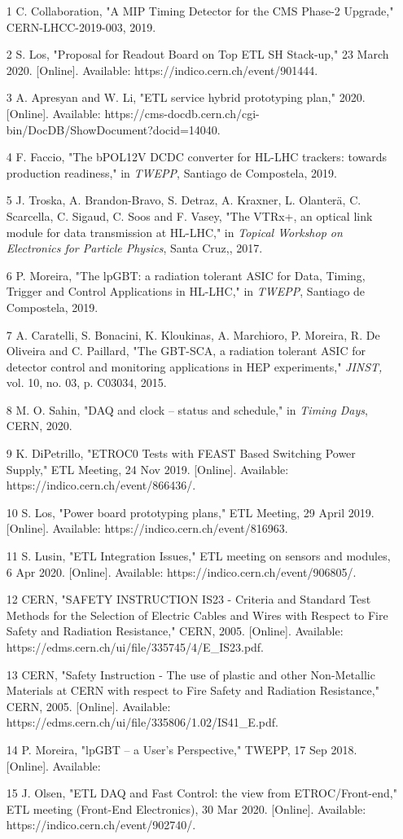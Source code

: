 \documentclass[11pt]{article}
\begin{document}
\begin{itemize}
  \item [1]  C. Collaboration, "A MIP Timing Detector for the CMS Phase-2 Upgrade," CERN-LHCC-2019-003, 2019.
  \item [2]  S. Los, "Proposal for Readout Board on Top ETL SH Stack-up," 23 March 2020. [Online]. Available: https://indico.cern.ch/event/901444.
  \item [3]  A. Apresyan and W. Li, "ETL service hybrid prototyping plan," 2020. [Online]. Available: https://cms-docdb.cern.ch/cgi-bin/DocDB/ShowDocument?docid=14040.
  \item [4]  F. Faccio, "The bPOL12V DCDC converter for HL-LHC trackers: towards production readiness," in \emph{TWEPP}, Santiago de Compostela, 2019.
  \item [5]  J. Troska, A. Brandon-Bravo, S. Detraz, A. Kraxner, L. Olanterä, C. Scarcella, C. Sigaud, C. Soos and F. Vasey, "The VTRx+, an optical link module for data transmission at HL-LHC," in \emph{Topical Workshop on Electronics for Particle Physics}, Santa Cruz,, 2017.
  \item [6]  P. Moreira, "The lpGBT: a radiation tolerant ASIC for Data, Timing, Trigger and Control Applications in HL-LHC," in \emph{TWEPP}, Santiago de Compostela, 2019.
  \item [7]  A. Caratelli, S. Bonacini, K. Kloukinas, A. Marchioro, P. Moreira, R. De Oliveira and C. Paillard, "The GBT-SCA, a radiation tolerant ASIC for detector control and monitoring applications in HEP experiments," \emph{JINST,} vol. 10, no. 03, p. C03034, 2015.
  \item [8]  M. O. Sahin, "DAQ and clock -- status and schedule," in \emph{Timing Days}, CERN, 2020.
  \item [9]  K. DiPetrillo, "ETROC0 Tests with FEAST Based Switching Power Supply," ETL Meeting, 24 Nov 2019. [Online]. Available: https://indico.cern.ch/event/866436/.
  \item [10]  S. Los, "Power board prototyping plans," ETL Meeting, 29 April 2019. [Online]. Available: https://indico.cern.ch/event/816963.
  \item [11]  S. Lusin, "ETL Integration Issues," ETL meeting on sensors and modules, 6 Apr 2020. [Online]. Available: https://indico.cern.ch/event/906805/.
  \item [12]  CERN, "SAFETY INSTRUCTION IS23 - Criteria and Standard Test Methods for the Selection of Electric Cables and Wires with Respect to Fire Safety and Radiation Resistance," CERN, 2005. [Online]. Available:
    https://edms.cern.ch/ui/file/335745/4/E\_IS23.pdf.
  \item [13]  CERN, "Safety Instruction - The use of plastic and other Non-Metallic Materials at CERN with respect to Fire Safety and Radiation Resistance," CERN, 2005. [Online]. Available: https://edms.cern.ch/ui/file/335806/1.02/IS41\_E.pdf.
  \item [14]  P. Moreira, "lpGBT -- a User's Perspective," TWEPP, 17 Sep 2018. [Online]. Available:
  \item [15]  J. Olsen, "ETL DAQ and Fast Control: the view from ETROC/Front-end," ETL meeting (Front-End Electronics), 30 Mar 2020. [Online]. Available: https://indico.cern.ch/event/902740/.
\end{itemize}
\end{document}
